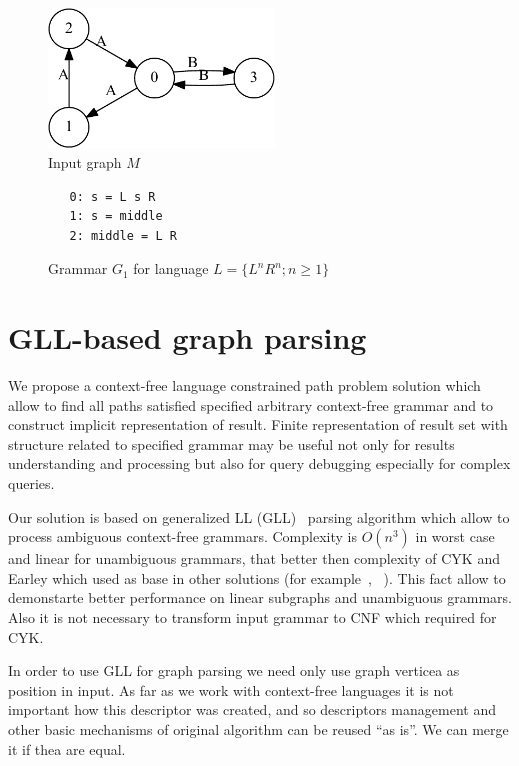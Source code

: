 \documentclass{sig-alternate} %
\begin{document}
\begin{figure}[h]
    \begin{center}
        \includegraphics[width=6cm]{dot/input.pdf}
        \caption{Input graph $M$}
        \label{input}        
    \end{center}
\end{figure}

\begin{figure}[h]
   \begin{center}
\begin{verbatim}
   0: s = L s R 
   1: s = middle
   2: middle = L R
\end{verbatim}
   \caption{Grammar $G_1$ for language $L=\{L^n R^n; n \geq 1\}$}
   \label{grammarG}        
   \end{center}
\end{figure}

\section{GLL-based graph parsing}
We propose a context-free language constrained path problem solution which allow to find all paths satisfied specified arbitrary context-free grammar and to construct implicit representation of result. 
Finite representation of result set with structure related to specified grammar may be useful not only for results understanding and processing but also for query debugging especially for complex queries. 

Our solution is based on generalized LL (GLL)~\cite{scott2010gll, FastPracticalGLL} parsing algorithm which allow to process ambiguous context-free grammars.
Complexity is $O(n^3)$ in worst case and linear for unambiguous grammars, that better then complexity of CYK and Earley which used as base in other solutions (for example~\cite{ConjCFPathQuery}, ~\cite{GraphQueryWithEarley}).
This fact allow to demonstarte better performance on linear subgraphs and unambiguous grammars.
Also it is not necessary to transform input grammar to CNF which required for CYK.

In order to use GLL for graph parsing we need only use graph verticea as position in input.
As far as we work with context-free languages it is not important how this descriptor was created, and so descriptors management and other basic mechanisms of original algorithm can be reused ``as is''. 
We can merge it if thea are equal. 
\end{document}
